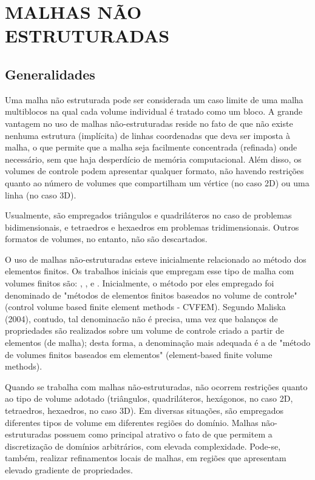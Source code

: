 \chapter[MALHAS NÃO ESTRUTURADAS]{MALHAS NÃO ESTRUTURADAS}
\label{MALHAS NAO ESTRUTURADAS}
\section{Generalidades}

Uma malha não estruturada pode ser considerada um caso limite de uma malha multiblocos na qual cada volume individual é tratado como um bloco. A grande vantagem no uso de malhas não-estruturadas reside no fato de que não existe nenhuma estrutura (implícita) de linhas coordenadas que deva ser imposta à malha, o que permite que a malha seja facilmente concentrada (refinada) onde necessário, sem que haja desperdício de memória computacional. Além disso, os volumes de controle podem apresentar qualquer formato, não havendo restrições quanto ao número de volumes que compartilham um vértice (no caso 2D) ou uma linha (no caso 3D). \cite{Versteeg2007}

Usualmente, são empregados triângulos e quadriláteros no caso de problemas bidimensionais, e tetraedros e hexaedros em problemas tridimensionais. Outros formatos de volumes, no entanto, não são descartados.

O uso de malhas não-estruturadas esteve inicialmente relacionado ao método dos elementos finitos. Os trabalhos iniciais que empregam esse tipo de malha com volumes finitos são: \cite{winslow1966numerical}, \cite{baliga1980new}, \cite{baliga1983solution} e \cite{eiser1985trying}. Inicialmente, o método por eles empregado foi denominado de "métodos de elementos finitos baseados no volume de controle"(control volume based finite element methods - CVFEM). Segundo Maliska (2004), contudo, tal denominacão não é precisa, uma vez que balanços de propriedades são realizados sobre um volume de controle criado a partir de elementos (de malha); desta forma, a denominação mais adequada é a de "método de volumes finitos baseados em elementos" (element-based finite volume methods).

Quando se trabalha com malhas não-estruturadas, não ocorrem restrições quanto ao tipo de volume adotado (triângulos, quadriláteros, hexágonos, no caso 2D, tetraedros, hexaedros, no caso 3D). Em diversas situações, são empregados diferentes tipos de volume em diferentes regiões do domínio. Malhas não-estruturadas possuem como principal atrativo o fato de que permitem a discretização de domínios arbitrários, com elevada complexidade. Pode-se, também, realizar refinamentos locais de malhas, em regiões que apresentam elevado gradiente de propriedades.

